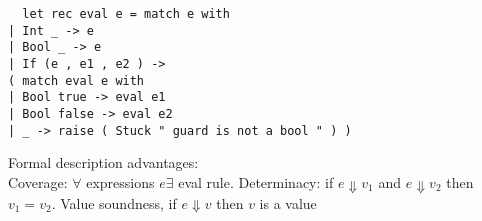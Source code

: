 \begin{lstlisting}
  let rec eval e = match e with
| Int _ -> e
| Bool _ -> e
| If (e , e1 , e2 ) ->
( match eval e with
| Bool true -> eval e1
| Bool false -> eval e2
| _ -> raise ( Stuck " guard is not a bool " ) )
\end{lstlisting}
Formal description advantages:
\\ Coverage: $\forall$ expressions $e \exists$ eval rule. Determinacy:
if $e \Downarrow v_1$ and $e \Downarrow v_2$ then $v_1=v_2$. Value
soundness, if $e \Downarrow v$ then $v$ is a value

\vspace{-1 em}
